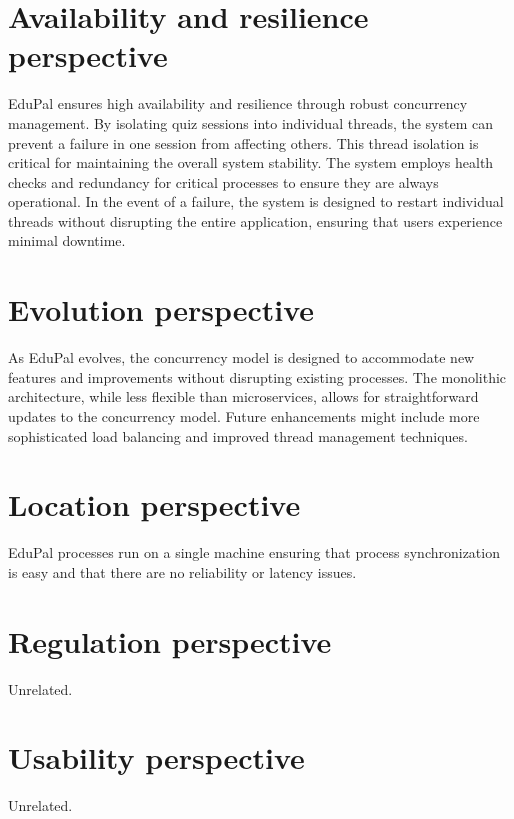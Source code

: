 \section{Availability and resilience perspective}

EduPal ensures high availability and resilience through robust concurrency management. By isolating quiz sessions into individual threads, the system can prevent a failure in one session from affecting others. This thread isolation is critical for maintaining the overall system stability. The system employs health checks and redundancy for critical processes to ensure they are always operational. In the event of a failure, the system is designed to restart individual threads without disrupting the entire application, ensuring that users experience minimal downtime.

\section{Evolution perspective}

As EduPal evolves, the concurrency model is designed to accommodate new features and improvements without disrupting existing processes. The monolithic architecture, while less flexible than microservices, allows for straightforward updates to the concurrency model. Future enhancements might include more sophisticated load balancing and improved thread management techniques.

\section{Location perspective}

EduPal processes run on a single machine ensuring that process synchronization is easy and that there are no reliability or latency issues.

\section{Regulation perspective}

Unrelated.

\section{Usability perspective}

Unrelated.
